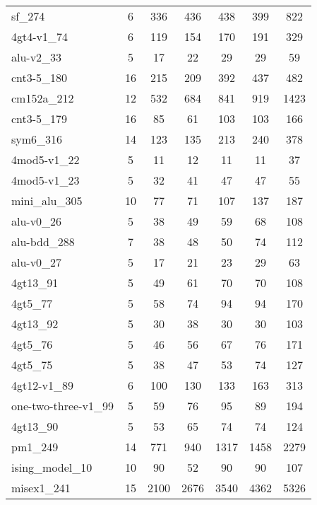\documentclass[journal]{IEEEtran}
\begin{document}
\begin{table*}[htbp]
\begin{center}
\begin{tabular}{|p{4.3cm}<{\centering}|c|c|c|c|c|c|}
                            sf\_274 & 6 & 336 & 436 & 438 & 399 & 822 \\
                            4gt4-v1\_74 & 6 & 119 & 154 & 170 & 191 & 329 \\
                            alu-v2\_33 & 5 & 17 & 22 & 29 & 29 & 59 \\
                            cnt3-5\_180 & 16 & 215 & 209 & 392 & 437 & 482 \\
                        cm152a\_212 & 12 & 532 & 684 & 841 & 919 & 1423 \\
                        cnt3-5\_179 & 16 & 85 & 61 & 103 & 103 & 166 \\
                        sym6\_316 & 14 & 123 & 135 & 213 & 240 & 378 \\
                        4mod5-v1\_22 & 5 & 11 & 12 & 11 & 11 & 37 \\
                        4mod5-v1\_23 & 5 & 32 & 41 & 47 & 47 & 55 \\
                        mini\_alu\_305 & 10 & 77 & 71 & 107 & 137 & 187 \\
                        alu-v0\_26 & 5 & 38 & 49 & 59 & 68 & 108 \\
                        alu-bdd\_288 & 7 & 38 & 48 & 50 & 74 & 112 \\
                        alu-v0\_27 & 5 & 17 & 21 & 23 & 29 & 63 \\
                        4gt13\_91 & 5 & 49 & 61 & 70 & 70 & 108 \\
                        4gt5\_77 & 5 & 58 & 74 & 94 & 94 & 170 \\
                        4gt13\_92 & 5 & 30 & 38 & 30 & 30 & 103 \\
                        4gt5\_76 & 5 & 46 & 56 & 67 & 76 & 171 \\
                        4gt5\_75 & 5 & 38 & 47 & 53 & 74 & 127 \\
                        4gt12-v1\_89 & 6 & 100 & 130 & 133 & 163 & 313 \\
                        one-two-three-v1\_99 & 5 & 59 & 76 & 95 & 89 & 194 \\
                        4gt13\_90 & 5 & 53 & 65 & 74 & 74 & 124 \\
                        pm1\_249 & 14 & 771 & 940 & 1317 & 1458 & 2279 \\
                        ising\_model\_10 & 10 & 90 & 52 & 90 & 90 & 107 \\
                        misex1\_241 & 15 & 2100 & 2676 & 3540 & 4362 & 5326 \\

\end{tabular}
\end{center}
\end{table*}
\end{document}
